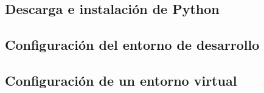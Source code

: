 \subsection{Descarga e instalación de Python}
\subsection{Configuración del entorno de desarrollo}
\subsection{Configuración de un entorno virtual}